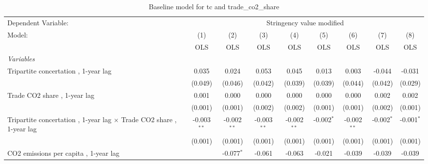 
\begin{table}[htbp]
   \caption{Baseline model for tc and trade\_co2\_share}
   \centering
   \begin{tabular}{lcccccccc}
      \toprule
      Dependent Variable: & \multicolumn{8}{c}{Stringency value modified}\\
      Model:                                                                      & (1)           & (2)           & (3)           & (4)           & (5)           & (6)           & (7)           & (8)\\  
                                                                                  &  OLS          & OLS           & OLS           & OLS           & OLS           & OLS           & OLS           & OLS\\  
      \midrule
      \emph{Variables}\\
      Tripartite concertation , 1-year lag                                        & 0.035         & 0.024         & 0.053         & 0.045         & 0.013         & 0.003         & -0.044        & -0.031\\   
                                                                                  & (0.049)       & (0.046)       & (0.042)       & (0.039)       & (0.039)       & (0.044)       & (0.042)       & (0.029)\\   
      Trade CO2 share , 1-year lag                                                & 0.001         & 0.000         & 0.000         & 0.000         & 0.000         & 0.000         & 0.002         & 0.002\\   
                                                                                  & (0.001)       & (0.001)       & (0.002)       & (0.002)       & (0.001)       & (0.001)       & (0.002)       & (0.001)\\   
      Tripartite concertation , 1-year lag $\times$ Trade CO2 share , 1-year lag  & -0.003$^{**}$ & -0.002$^{**}$ & -0.003$^{**}$ & -0.002$^{**}$ & -0.002$^{*}$  & -0.002$^{**}$ & -0.002$^{*}$  & -0.001$^{*}$\\   
                                                                                  & (0.001)       & (0.001)       & (0.001)       & (0.001)       & (0.001)       & (0.001)       & (0.001)       & (0.001)\\   
      CO2 emissions per capita , 1-year lag                                       &               & -0.077$^{*}$  & -0.061        & -0.063        & -0.021        & -0.039        & -0.039        & -0.039\\   

\end{tabular}
\end{table}
